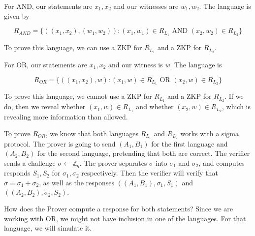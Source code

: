For AND, our statements are $x_1, x_2$ and our witnesses are $w_1, w_2$. The language is given by

\[ R_{AND} = \{ ((x_1, x_2), (w_1, w_2)): (x_1, w_1) \in R_{L_1} \text{ AND } (x_2, w_2) \in R_{L_2}\}\]

To prove this language, we can use a ZKP for $R_{L_1}$ and a ZKP for $R_{L_2}$.

For OR, our statements are $x_1, x_2$ and our witness is $w$. The language is

\[ R_{OR} = \{ ((x_1, x_2), w): (x_1, w) \in R_{L_1} \text{ OR } (x_2, w) \in R_{L_2}\}\]

To prove this language, we cannot use a ZKP for $R_{L_1}$ and a ZKP for $R_{L_2}$. If we do, then we reveal whether $(x_1, w) \in R_{L_1}$ and whether $(x_2, w) \in R_{L_2}$, which is revealing more information than allowed.

To prove $R_{OR}$, we know that both languages $R_{L_1}$ and $R_{L_2}$ works with a sigma protocol. The prover is going to send $(A_1, B_1)$ for the first language and $(A_2, B_2)$ for the second language, pretending that both are correct. The verifier sends a challenge $\sigma \gets \mathbb{Z}_q$. The prover separates $\sigma$ into $\sigma_1$ and $\sigma_2$, and computes responds $S_1, S_2$ for $\sigma_1, \sigma_2$ respectively. Then the verifier will verify that $\sigma = \sigma_1 + \sigma_2$, as well as the responses $((A_1, B_1), \sigma_1, S_1)$ and $((A_2, B_2), \sigma_2, S_2)$.

How does the Prover compute a response for both statements? Since we are working with OR, we might not have inclusion in one of the languages. For that language, we will simulate it.
